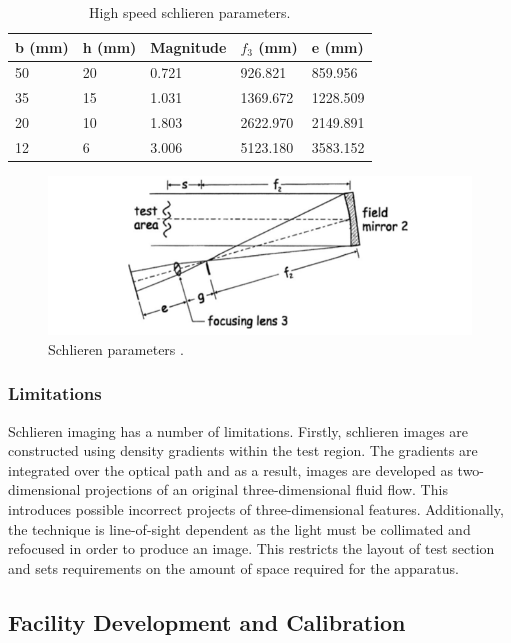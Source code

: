 \begin{table}[h]
\centering
\caption{High speed schlieren parameters.}
\label{tab:highspeed}
\begin{tabular}{@{}lllll@{}}
\toprule
b (mm) & h (mm) & Magnitude & $f_3$ (mm) & e (mm)   \\ \midrule
50     & 20     & 0.721     & 926.821    & 859.956  \\
35     & 15     & 1.031     & 1369.672   & 1228.509 \\
20     & 10     & 1.803     & 2622.970   & 2149.891 \\
12     & 6      & 3.006     & 5123.180   & 3583.152 \\ \bottomrule
\end{tabular}
\end{table}

\begin{figure}[H] 
	\centering
	\includegraphics[scale=0.8]{settle.png} 
	\caption{Schlieren parameters \citep{settles2001schlieren}.}
	\label{fig:settle}
\end{figure}

\subsubsection{Limitations}
Schlieren imaging has a number of limitations. Firstly, schlieren images are constructed using density gradients within the test region. The gradients are integrated over the optical path and as a result, images are developed as two-dimensional projections of an original three-dimensional fluid flow. This introduces possible incorrect projects of three-dimensional features. Additionally, the technique is line-of-sight dependent as the light must be collimated and refocused in order to produce an image. This restricts the layout of test section and sets requirements on the amount of space required for the apparatus. 

\subsection{Facility Development and Calibration}
